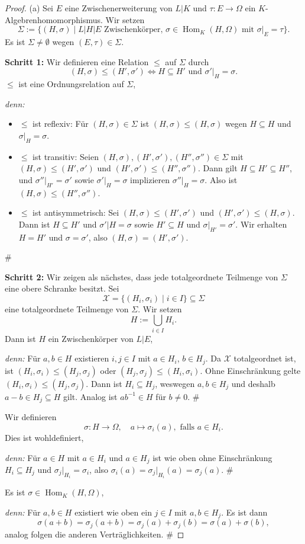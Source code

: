 \documentclass[a4paper, twoside, 11pt, ngerman]{report}
\newcommand{\calX}{\mathcal X}
\DeclareMathOperator{\Hom}{Hom}
\theoremstyle{definistyle}
\theoremstyle{remark}
\newenvironment{denn}%
  {\par\textit{denn:}}%
  {\hfill\#\par}
\begin{document}
\begin{proof}
(a) Sei $E$ eine Zwischenerweiterung von $L|K$ und $\tau \colon E \to \Omega$ ein $K$-Al\-ge\-bren\-homo\-morphismus. Wir setzen
\[
\Sigma := \{(H, \sigma) \mid L|H|E \text{ Zwischenkörper, } \sigma \in \Hom_K(H, \Omega)\text{ mit } \sigma|_E = \tau\}.
\]
Es ist $\Sigma \neq \emptyset$ wegen $(E, \tau) \in \Sigma$.

\textbf{Schritt 1:}
Wir definieren eine Relation $\leq$ auf $\Sigma$ durch
\[
(H, \sigma) \leq (H', \sigma') \iff H \subseteq H' \text{ und } \sigma'|_H = \sigma.
\]
$\leq$ ist eine Ordnungsrelation auf $\Sigma$,
\begin{denn}
\begin{itemize}
\item $\leq$ ist reflexiv: Für $(H, \sigma) \in \Sigma$ ist $(H, \sigma) \leq (H, \sigma)$ wegen $H \subseteq H$ und $\sigma|_H = \sigma$.
\item $\leq$ ist transitiv: Seien $(H, \sigma), (H', \sigma'), (H'', \sigma'') \in \Sigma$ mit $(H, \sigma) \leq (H', \sigma')$ und $(H', \sigma') \leq (H'', \sigma'')$. Dann gilt $H \subseteq H' \subseteq H''$, und $\sigma''|_{H'} = \sigma'$ sowie $\sigma'|_H = \sigma$ implizieren $\sigma''|_H = \sigma$. Also ist $(H, \sigma) \leq (H'', \sigma'')$.
\item $\leq$ ist antisymmetrisch: Sei $(H, \sigma) \leq (H', \sigma')$ und $(H', \sigma') \leq (H, \sigma)$. 
Dann ist $H\subseteq H'$ und $\sigma'|H=\sigma$ sowie $H'\subseteq H$ und $\sigma|_{H'}=\sigma'$.
Wir erhalten $H = H'$ und $\sigma = \sigma'$, also $(H, \sigma) = (H', \sigma')$.
\end{itemize}
\end{denn}
\textbf{Schritt 2:}
Wir zeigen als nächstes, dass jede totalgeordnete Teilmenge von $\Sigma$ eine obere Schranke besitzt.
Sei 
\[\calX=\{(H_i, \sigma_i) \mid i \in I\} \subseteq \Sigma\]
eine totalgeordnete Teilmenge von $\Sigma$. Wir setzen
\[H := \bigcup_{i \in I} H_i.\]
Dann ist $H$ ein Zwischenkörper von $L|E$, 
\begin{denn}
Für $a, b \in H$ existieren $i,j\in I$ mit $a\in H_i$, $b\in H_j$. Da $\calX$ totalgeordnet ist, ist $(H_i, \sigma_i) \leq (H_j, \sigma_j)$ oder $(H_j, \sigma_j) \leq (H_i, \sigma_i)$. Ohne Einschränkung gelte $(H_i, \sigma_i) \leq (H_j, \sigma_j)$. Dann ist $H_i\subseteq H_j$, weswegen $a,b\in H_j$ und deshalb $a-b\in H_j\subseteq H$ gilt.
Analog ist $ab^{-1}\in H$ für $b\neq0$. 
\end{denn}
Wir definieren
\[
\sigma\colon H \to \Omega,\quad a\mapsto \sigma_i(a), \text{ falls }a \in H_i. 
\]
Dies ist wohldefiniert,
\begin{denn}
Für $a\in H$ mit $a \in H_i$ und $a \in H_j$ ist wie oben ohne Einschränkung  $H_i \subseteq H_j$ und $\sigma_j|_{H_i}=\sigma_i$, also $\sigma_i(a)=\sigma_j|_{H_i}(a)=\sigma_j(a)$.
\end{denn}
Es ist $\sigma\in\Hom_K(H,\Omega)$,
\begin{denn}
Für $a, b \in H$ existiert wie oben ein $j\in I$ mit $a,b\in H_j$. Es ist dann 
\[
\sigma(a+b)=\sigma_j(a+b)=\sigma_j(a)+\sigma_j(b)=\sigma(a)+\sigma(b),
\]
analog folgen die anderen Verträglichkeiten.
\end{denn}


\end{proof}
\end{document}
